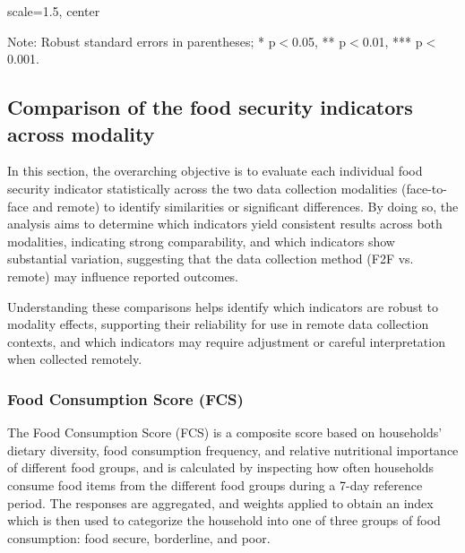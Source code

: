 \documentclass[11pt,harvard]{article}
\begin{document}
	\begin{table}[htbp]
		\centering
		\begin{adjustbox}{scale=1.5, center} %
			\begin{threeparttable}
				\caption{rCARI: FES vs. Income - Paired (Remote Surveys)}
				\footnotesize
				 
				\label{tab:BF_RM_Paired_ttest_Full}
				\begin{tablenotes}
					\item Note: Robust standard errors in parentheses; * p$<$0.05, ** p$<$0.01, *** p$<$0.001.
				\end{tablenotes}
			\end{threeparttable}
		\end{adjustbox}
	\end{table}
	
	\subsection{Comparison of the food security indicators across modality} 
	
	In this section, the overarching objective is to evaluate each individual food security indicator statistically across the two data collection modalities (face-to-face and remote) to identify similarities or significant differences. By doing so, the analysis aims to determine which indicators yield consistent results across both modalities, indicating strong comparability, and which indicators show substantial variation, suggesting that the data collection method (F2F vs. remote) may influence reported outcomes.

	Understanding these comparisons helps identify which indicators are robust to modality effects, supporting their reliability for use in remote data collection contexts, and which indicators may require adjustment or careful interpretation when collected remotely.
	
	\subsubsection{Food Consumption Score (FCS)}
	
	The Food Consumption Score (FCS) is a composite score based on households’ dietary diversity, food consumption frequency, and relative nutritional importance of different food groups, and is calculated by inspecting how often households consume food items from the different food groups during a 7-day reference period. The responses are aggregated, and weights applied to obtain an index which is then used to categorize the household into one of three groups of food consumption: food secure, borderline, and poor.
	
\end{document}
